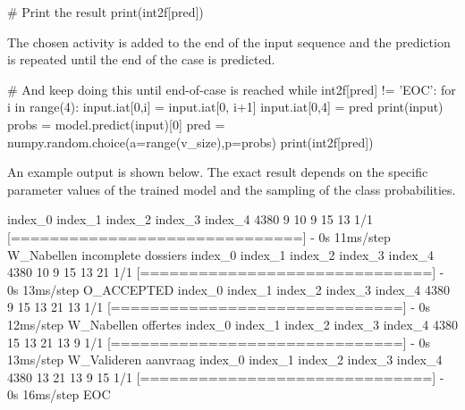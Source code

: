 \begin{withcode}
\begin{pythoncode}
# Print the result
print(int2f[pred])
\end{pythoncode}

The chosen activity is added to the end of the input sequence and the prediction is repeated until the end of the case is predicted.

\begin{pythoncode}
# And keep doing this until end-of-case is reached
while int2f[pred] != 'EOC':
    for i in range(4):
        input.iat[0,i] = input.iat[0, i+1]
    input.iat[0,4] = pred
    print(input)
    probs = model.predict(input)[0]
    pred = numpy.random.choice(a=range(v_size),p=probs)
    print(int2f[pred])
\end{pythoncode}

An example output is shown below. The exact result depends on the specific parameter values of the trained model and the sampling of the class probabilities.

\begin{textcode}
      index_0  index_1  index_2  index_3  index_4
4380        9       10        9       15       13
1/1 [==============================] - 0s 11ms/step
W_Nabellen incomplete dossiers
      index_0  index_1  index_2  index_3  index_4
4380       10        9       15       13       21
1/1 [==============================] - 0s 13ms/step
O_ACCEPTED
      index_0  index_1  index_2  index_3  index_4
4380        9       15       13       21       13
1/1 [==============================] - 0s 12ms/step
W_Nabellen offertes
      index_0  index_1  index_2  index_3  index_4
4380       15       13       21       13        9
1/1 [==============================] - 0s 13ms/step
W_Valideren aanvraag
      index_0  index_1  index_2  index_3  index_4
4380       13       21       13        9       15
1/1 [==============================] - 0s 16ms/step
EOC
\end{textcode}



\end{withcode}
